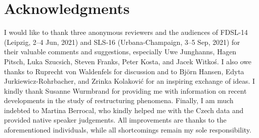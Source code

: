 \documentclass[output=paper,colorlinks,citecolor=brown]{langscibook}
\begin{document}
\section*{Acknowledgments}
I would like to thank three anonymous reviewers and the audiences of FDSL-14 (Leipzig, 2–4 Jun, 2021) and SLS-16 (Urbana-Champaign, 3–5 Sep, 2021) for their valuable comments and suggestions, especially Uwe Junghanns, Hagen Pitsch, Luka Szucsich, Steven Franks, Peter Kosta, and Jacek Witkoś. I also owe thanks to Ruprecht von Waldenfels for discussion and to Björn Hansen, Edyta Jurkiewicz-Rohrbacher, and Zrinka Kolaković for an inspiring exchange of ideas. I kindly thank Susanne Wurmbrand for providing me with information on recent deve\-lopments in the study of restructuring phenomena. Finally, I am much indebted to Martina Berrocal, who kindly helped me with the Czech data and provided native speaker judgements. All improvements are thanks to the aforementioned individuals, while all shortcomings remain my sole responsibility.

\printbibliography[heading=subbibliography,notkeyword=this]
\end{document}
